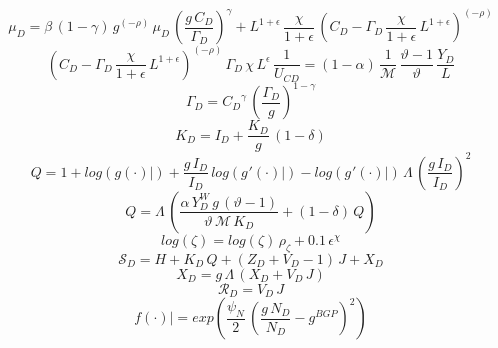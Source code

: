 \documentclass[10pt,a4paper]{article}
\begin{document}
\begin{dmath}
{{\mu}_{D}}=\beta\, \left(1-\gamma\right)\, {g}^{\left(-\rho\right)}\, {{\mu}_{D}}\, \left(\frac{{g}\, {C_D}}{{\Gamma_D}}\right)^{\gamma}+{L}^{1+\epsilon}\, \frac{\chi}{1+\epsilon}\, \left({C_D}-{\Gamma_D}\, \frac{\chi}{1+\epsilon}\, {L}^{1+\epsilon}\right)^{\left(-\rho\right)}
\end{dmath}
\begin{dmath}
\left({C_D}-{\Gamma_D}\, \frac{\chi}{1+\epsilon}\, {L}^{1+\epsilon}\right)^{\left(-\rho\right)}\, {\Gamma_D}\, \chi\, {L}^{\epsilon}\, \frac{1}{{U_{CD}}}=\left(1-\alpha\right)\, \frac{1}{\mathcal{M}}\, \frac{\vartheta-1}{\vartheta}\, \frac{{Y_D}}{{L}}
\end{dmath}
\begin{dmath}
{\Gamma_D}={C_D}^{\gamma}\, \left(\frac{{\Gamma_D}}{{g}}\right)^{1-\gamma}
\end{dmath}
\begin{dmath}
{K_D}={I_D}+\frac{{K_D}}{{g}}\, \left(1-\delta\right)
\end{dmath}
\begin{dmath}
{Q}=1+log\left({\left.       g\left( \cdot \right)            \right|}\right)+\frac{{g}\, {I_D}}{{I_D}}\, log\left({\left.       g^‎{\prime}\left( \cdot \right)   \right|}\right)-log\left({\left.       g^‎{\prime}\left( \cdot \right)   \right|}\right)\, {\Lambda}\, \left(\frac{{g}\, {I_D}}{{I_D}}\right)^{2}
\end{dmath}
\begin{dmath}
{Q}={\Lambda}\, \left(\frac{\alpha\, {Y^W_D}\, {g}\, \left(\vartheta-1\right)}{\vartheta\, \mathcal{M}\, {K_D}}+\left(1-\delta\right)\, {Q}\right)
\end{dmath}
\begin{dmath}
log\left({\zeta}\right)=log\left({\zeta}\right)\, {\rho}_{\zeta}+0.1\, {\epsilon}^{\chi}
\end{dmath}
\begin{dmath}
{\mathcal{S}_{D}}={H}+{K_D}\, {Q}+\left({Z_D}+{V_D}-1\right)\, {J}+{X_D}
\end{dmath}
\begin{dmath}
{X_D}={g}\, {\Lambda}\, \left({X_D}+{V_D}\, {J}\right)
\end{dmath}
\begin{dmath}
{\mathcal{R}_{D}}={V_D}\, {J}
\end{dmath}
\begin{dmath}
{\left.       f\left( \cdot \right)            \right|}=exp\left(\frac{\psi_N}{2}\, \left(\frac{{g}\, {N_D}}{{N_D}}-g^{BGP}\right)^{2}\right)
\end{dmath}
\end{document}
